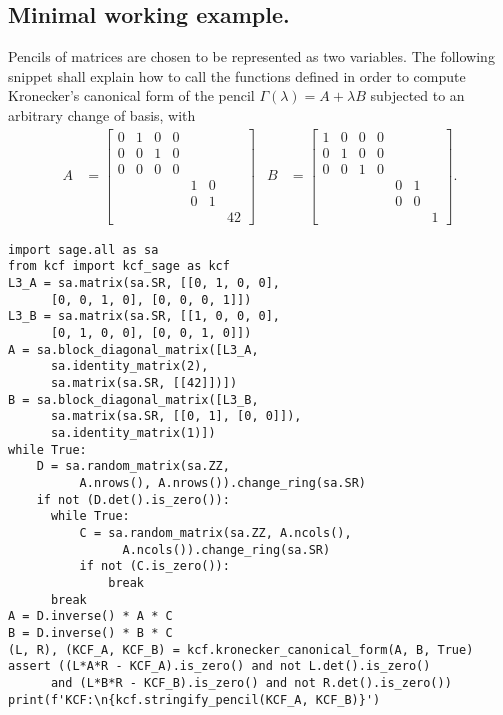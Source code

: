 \subsection*{Minimal working example.}
Pencils of matrices are chosen to be represented as two variables. The following snippet shall explain how to
call the functions defined in order to compute Kronecker's canonical form of the pencil
\(\Gamma(\lambda) = A + \lambda B\) subjected to an arbitrary change of basis, with
\begin{align*}
    A &=
    \begin{bmatrix}
        0 & 1 & 0 & 0 \\
        0 & 0 & 1 & 0 \\
        0 & 0 & 0 & 0 \\
        & & & & 1 & 0 \\
        & & & & 0 & 1 \\
        & & & & & & 42
    \end{bmatrix} &
    B &=
    \begin{bmatrix}
        1 & 0 & 0 & 0 \\
        0 & 1 & 0 & 0 \\
        0 & 0 & 1 & 0 \\
        & & & & 0 & 1 \\
        & & & & 0 & 0 \\
        & & & & & & 1
    \end{bmatrix}.
\end{align*}
\begin{verbatim}
import sage.all as sa
from kcf import kcf_sage as kcf
L3_A = sa.matrix(sa.SR, [[0, 1, 0, 0],
      [0, 0, 1, 0], [0, 0, 0, 1]])
L3_B = sa.matrix(sa.SR, [[1, 0, 0, 0],
      [0, 1, 0, 0], [0, 0, 1, 0]])
A = sa.block_diagonal_matrix([L3_A,
      sa.identity_matrix(2),
      sa.matrix(sa.SR, [[42]])])
B = sa.block_diagonal_matrix([L3_B,
      sa.matrix(sa.SR, [[0, 1], [0, 0]]),
      sa.identity_matrix(1)])
while True:
    D = sa.random_matrix(sa.ZZ,
          A.nrows(), A.nrows()).change_ring(sa.SR)
    if not (D.det().is_zero()):
      while True:
          C = sa.random_matrix(sa.ZZ, A.ncols(),
                A.ncols()).change_ring(sa.SR)
          if not (C.is_zero()):
              break
      break
A = D.inverse() * A * C
B = D.inverse() * B * C
(L, R), (KCF_A, KCF_B) = kcf.kronecker_canonical_form(A, B, True)
assert ((L*A*R - KCF_A).is_zero() and not L.det().is_zero()
      and (L*B*R - KCF_B).is_zero() and not R.det().is_zero())
print(f'KCF:\n{kcf.stringify_pencil(KCF_A, KCF_B)}')
\end{verbatim}